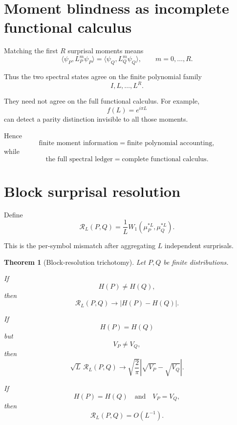 \documentclass[11pt,a4paper]{article}
\newtheorem{theorem}{Theorem}[section]
\newcommand{\1}{\mathbf 1}
\newcommand{\ip}[2]{\langle #1,#2\rangle}
\begin{document}
\section{Moment blindness as incomplete functional calculus}

Matching the first \(R\) surprisal moments means
\[
\ip{\psi_P}{L_P^m\psi_P}
=
\ip{\psi_Q}{L_Q^m\psi_Q},
\qquad
m=0,\ldots,R.
\tag{24.1}
\]

Thus the two spectral states agree on the finite polynomial family
\[
I,L,\ldots,L^R.
\]

They need not agree on the full functional calculus.
For example,
\[
f(L)=e^{i\pi L}
\tag{24.2}
\]
can detect a parity distinction invisible to all those moments.

Hence
\[
\boxed{
\text{finite moment information}
=
\text{finite polynomial accounting},
}
\tag{24.3}
\]
while
\[
\boxed{
\text{the full spectral ledger}
=
\text{complete functional calculus}.
}
\tag{24.4}
\]


\section{Block surprisal resolution}

Define
\[
\boxed{
\mathcal R_L(P,Q)
=
\frac1L
W_1(\mu_P^{*L},\mu_Q^{*L}).
}
\tag{25.1}
\]

This is the per-symbol mismatch after aggregating \(L\) independent
surprisals.

\begin{theorem}[Block-resolution trichotomy]
Let \(P,Q\) be finite distributions.

If
\[
H(P)\ne H(Q),
\]
then
\[
\boxed{
\mathcal R_L(P,Q)
\to
|H(P)-H(Q)|.
}
\tag{25.2}
\]

If
\[
H(P)=H(Q)
\]
but
\[
V_P\ne V_Q,
\]
then
\[
\boxed{
\sqrt L\,\mathcal R_L(P,Q)
\to
\sqrt{\frac2\pi}
\left|
\sqrt{V_P}-\sqrt{V_Q}
\right|.
}
\tag{25.3}
\]

If
\[
H(P)=H(Q)
\quad\text{and}\quad
V_P=V_Q,
\]
then
\[
\boxed{
\mathcal R_L(P,Q)=O(L^{-1}).
}
\tag{25.4}
\]
\end{theorem}
\end{document}
